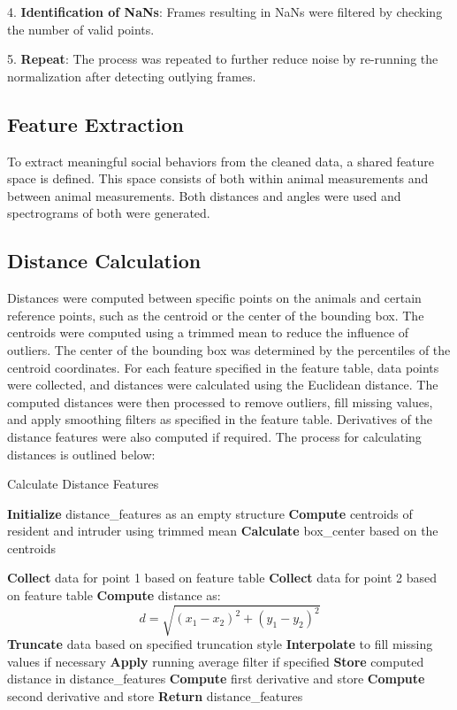 \documentclass[12pt,english]{article}
\begin{document}
4. \textbf{Identification of NaNs}: Frames resulting in NaNs were filtered by checking the number of valid points.

5. \textbf{Repeat}: The process was repeated to further reduce noise by re-running the normalization after detecting outlying frames.


\subsection{Feature Extraction}
To extract meaningful social behaviors from the cleaned data, a shared feature space is defined. This space consists of both within animal measurements and between animal measurements. Both distances and angles were used and spectrograms of both were generated.



\subsection{Distance Calculation}
Distances were computed between specific points on the animals and certain reference points, such as the centroid or the center of the bounding box. The centroids were computed using a trimmed mean to reduce the influence of outliers. The center of the bounding box was determined by the percentiles of the centroid coordinates. For each feature specified in the feature table, data points were collected, and distances were calculated using the Euclidean distance. The computed distances were then processed to remove outliers, fill missing values, and apply smoothing filters as specified in the feature table. Derivatives of the distance features were also computed if required. The process for calculating distances is outlined below:

\begin{algorithm}
\caption{Calculate Distance Features}
\begin{algorithmic}[1]
\State \textbf{Initialize} distance\_features as an empty structure
\State \textbf{Compute} centroids of resident and intruder using trimmed mean
\State \textbf{Calculate} box\_center based on the centroids

        \State \textbf{Collect} data for point 1 based on feature table
        \State \textbf{Collect} data for point 2 based on feature table
        \State \textbf{Compute} distance as:
        \[
        d = \sqrt{(x_1 - x_2)^2 + (y_1 - y_2)^2}
        \]
        \State \textbf{Truncate} data based on specified truncation style
        \State \textbf{Interpolate} to fill missing values if necessary
        \State \textbf{Apply} running average filter if specified
        \State \textbf{Store} computed distance in distance\_features
            \State \textbf{Compute} first derivative and store
                \State \textbf{Compute} second derivative and store
            \EndIf
        \EndIf
    \EndIf
\EndFor
\State \textbf{Return} distance\_features
\end{algorithmic}
\end{algorithm}
\end{document}
